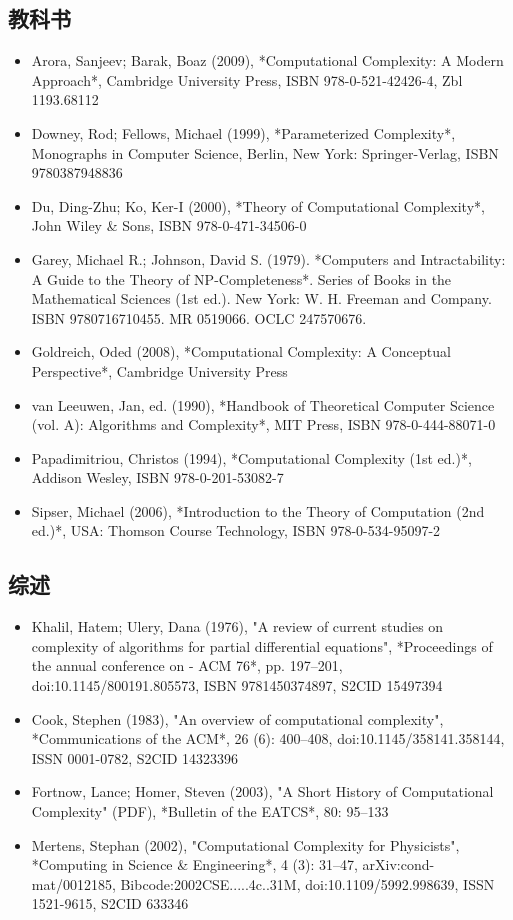 \subsection{教科书}
\begin{itemize}
\item Arora, Sanjeev; Barak, Boaz (2009), *Computational Complexity: A Modern Approach*, Cambridge University Press, ISBN 978-0-521-42426-4, Zbl 1193.68112
\item Downey, Rod; Fellows, Michael (1999), *Parameterized Complexity*, Monographs in Computer Science, Berlin, New York: Springer-Verlag, ISBN 9780387948836
\item Du, Ding-Zhu; Ko, Ker-I (2000), *Theory of Computational Complexity*, John Wiley & Sons, ISBN 978-0-471-34506-0
\item Garey, Michael R.; Johnson, David S. (1979). *Computers and Intractability: A Guide to the Theory of NP-Completeness*. Series of Books in the Mathematical Sciences (1st ed.). New York: W. H. Freeman and Company. ISBN 9780716710455. MR 0519066. OCLC 247570676.
\item Goldreich, Oded (2008), *Computational Complexity: A Conceptual Perspective*, Cambridge University Press
\item van Leeuwen, Jan, ed. (1990), *Handbook of Theoretical Computer Science (vol. A): Algorithms and Complexity*, MIT Press, ISBN 978-0-444-88071-0
\item Papadimitriou, Christos (1994), *Computational Complexity (1st ed.)*, Addison Wesley, ISBN 978-0-201-53082-7
\item Sipser, Michael (2006), *Introduction to the Theory of Computation (2nd ed.)*, USA: Thomson Course Technology, ISBN 978-0-534-95097-2
\end{itemize}
\subsection{综述}
\begin{itemize}
\item Khalil, Hatem; Ulery, Dana (1976), "A review of current studies on complexity of algorithms for partial differential equations", *Proceedings of the annual conference on - ACM 76*, pp. 197–201, doi:10.1145/800191.805573, ISBN 9781450374897, S2CID 15497394
\item Cook, Stephen (1983), "An overview of computational complexity", *Communications of the ACM*, 26 (6): 400–408, doi:10.1145/358141.358144, ISSN 0001-0782, S2CID 14323396
\item Fortnow, Lance; Homer, Steven (2003), "A Short History of Computational Complexity" (PDF), *Bulletin of the EATCS*, 80: 95–133
\item Mertens, Stephan (2002), "Computational Complexity for Physicists", *Computing in Science & Engineering*, 4 (3): 31–47, arXiv:cond-mat/0012185, Bibcode:2002CSE.....4c..31M, doi:10.1109/5992.998639, ISSN 1521-9615, S2CID 633346
\end{itemize}
  




 